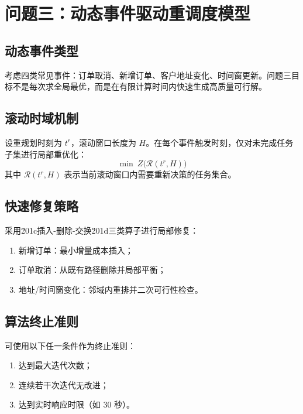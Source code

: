 \section{问题三：动态事件驱动重调度模型}

\subsection{动态事件类型}
考虑四类常见事件：订单取消、新增订单、客户地址变化、时间窗更新。问题三目标不是每次求全局最优，而是在有限计算时间内快速生成高质量可行解。

\subsection{滚动时域机制}
设重规划时刻为 $t^r$，滚动窗口长度为 $H$。在每个事件触发时刻，仅对未完成任务子集进行局部重优化：
\begin{equation}
\min \ Z\bigl(\mathcal{R}(t^r,H)\bigr)
\end{equation}
其中 $\mathcal{R}(t^r,H)$ 表示当前滚动窗口内需要重新决策的任务集合。

\subsection{快速修复策略}
采用\u201c插入-删除-交换\u201d三类算子进行局部修复：
\begin{enumerate}[label=\arabic*)]
    \item 新增订单：最小增量成本插入；
    \item 订单取消：从既有路径删除并局部平衡；
    \item 地址/时间窗变化：邻域内重排并二次可行性检查。
\end{enumerate}

\subsection{算法终止准则}
可使用以下任一条件作为终止准则：
\begin{enumerate}[label=\arabic*)]
    \item 达到最大迭代次数；
    \item 连续若干次迭代无改进；
    \item 达到实时响应时限（如 30 秒）。
\end{enumerate}

